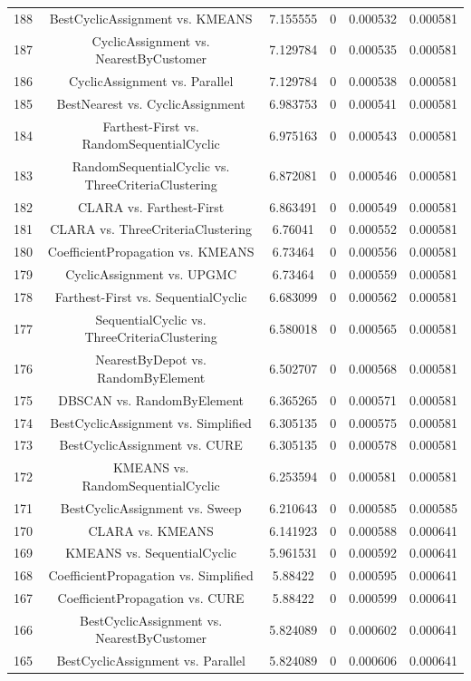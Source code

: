 \documentclass[a4paper,10pt]{article}
\begin{document}
\begin{landscape}
\begin{table}[!htp]
\begin{tabular}{cccccc}
188&BestCyclicAssignment vs. KMEANS&7.155555&0&0.000532&0.000581\\
187&CyclicAssignment vs. NearestByCustomer&7.129784&0&0.000535&0.000581\\
186&CyclicAssignment vs. Parallel&7.129784&0&0.000538&0.000581\\
185&BestNearest vs. CyclicAssignment&6.983753&0&0.000541&0.000581\\
184&Farthest-First vs. RandomSequentialCyclic&6.975163&0&0.000543&0.000581\\
183&RandomSequentialCyclic vs. ThreeCriteriaClustering&6.872081&0&0.000546&0.000581\\
182&CLARA vs. Farthest-First&6.863491&0&0.000549&0.000581\\
181&CLARA vs. ThreeCriteriaClustering&6.76041&0&0.000552&0.000581\\
180&CoefficientPropagation vs. KMEANS&6.73464&0&0.000556&0.000581\\
179&CyclicAssignment vs. UPGMC&6.73464&0&0.000559&0.000581\\
178&Farthest-First vs. SequentialCyclic&6.683099&0&0.000562&0.000581\\
177&SequentialCyclic vs. ThreeCriteriaClustering&6.580018&0&0.000565&0.000581\\
176&NearestByDepot vs. RandomByElement&6.502707&0&0.000568&0.000581\\
175&DBSCAN vs. RandomByElement&6.365265&0&0.000571&0.000581\\
174&BestCyclicAssignment vs. Simplified&6.305135&0&0.000575&0.000581\\
173&BestCyclicAssignment vs. CURE&6.305135&0&0.000578&0.000581\\
172&KMEANS vs. RandomSequentialCyclic&6.253594&0&0.000581&0.000581\\
171&BestCyclicAssignment vs. Sweep&6.210643&0&0.000585&0.000585\\
170&CLARA vs. KMEANS&6.141923&0&0.000588&0.000641\\
169&KMEANS vs. SequentialCyclic&5.961531&0&0.000592&0.000641\\
168&CoefficientPropagation vs. Simplified&5.88422&0&0.000595&0.000641\\
167&CoefficientPropagation vs. CURE&5.88422&0&0.000599&0.000641\\
166&BestCyclicAssignment vs. NearestByCustomer&5.824089&0&0.000602&0.000641\\
165&BestCyclicAssignment vs. Parallel&5.824089&0&0.000606&0.000641\\

\end{tabular}
\end{table}
\end{landscape}
\end{document}
